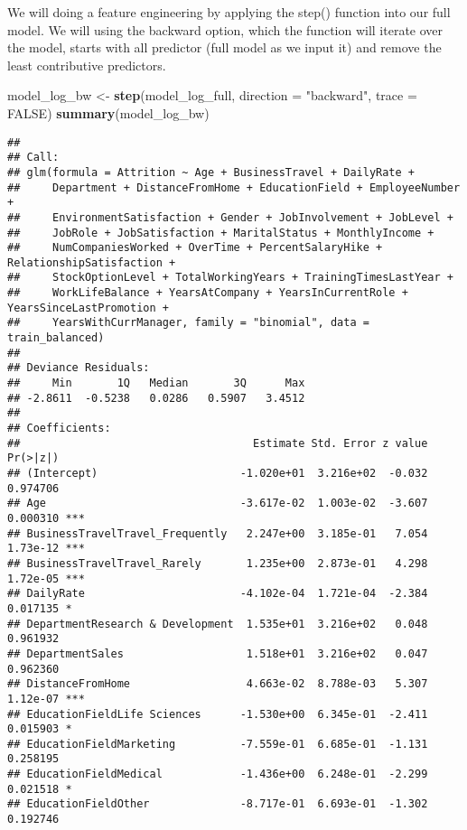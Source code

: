 \documentclass[
]{article}
\newenvironment{Shaded}{\begin{snugshade}}{\end{snugshade}}
\newcommand{\DataTypeTok}[1]{\textcolor[rgb]{0.13,0.29,0.53}{#1}}
\newcommand{\KeywordTok}[1]{\textcolor[rgb]{0.13,0.29,0.53}{\textbf{#1}}}
\newcommand{\NormalTok}[1]{#1}
\newcommand{\OtherTok}[1]{\textcolor[rgb]{0.56,0.35,0.01}{#1}}
\newcommand{\StringTok}[1]{\textcolor[rgb]{0.31,0.60,0.02}{#1}}
\begin{document}
We will doing a feature engineering by applying the step() function into
our full model. We will using the backward option, which the function
will iterate over the model, starts with all predictor (full model as we
input it) and remove the least contributive predictors.

\begin{Shaded}
\begin{Highlighting}[]
\NormalTok{model_log_bw <-}\StringTok{ }\KeywordTok{step}\NormalTok{(model_log_full, }\DataTypeTok{direction =} \StringTok{"backward"}\NormalTok{, }\DataTypeTok{trace =} \OtherTok{FALSE}\NormalTok{)}
\KeywordTok{summary}\NormalTok{(model_log_bw)}
\end{Highlighting}
\end{Shaded}

\begin{verbatim}
## 
## Call:
## glm(formula = Attrition ~ Age + BusinessTravel + DailyRate + 
##     Department + DistanceFromHome + EducationField + EmployeeNumber + 
##     EnvironmentSatisfaction + Gender + JobInvolvement + JobLevel + 
##     JobRole + JobSatisfaction + MaritalStatus + MonthlyIncome + 
##     NumCompaniesWorked + OverTime + PercentSalaryHike + RelationshipSatisfaction + 
##     StockOptionLevel + TotalWorkingYears + TrainingTimesLastYear + 
##     WorkLifeBalance + YearsAtCompany + YearsInCurrentRole + YearsSinceLastPromotion + 
##     YearsWithCurrManager, family = "binomial", data = train_balanced)
## 
## Deviance Residuals: 
##     Min       1Q   Median       3Q      Max  
## -2.8611  -0.5238   0.0286   0.5907   3.4512  
## 
## Coefficients:
##                                    Estimate Std. Error z value Pr(>|z|)    
## (Intercept)                      -1.020e+01  3.216e+02  -0.032 0.974706    
## Age                              -3.617e-02  1.003e-02  -3.607 0.000310 ***
## BusinessTravelTravel_Frequently   2.247e+00  3.185e-01   7.054 1.73e-12 ***
## BusinessTravelTravel_Rarely       1.235e+00  2.873e-01   4.298 1.72e-05 ***
## DailyRate                        -4.102e-04  1.721e-04  -2.384 0.017135 *  
## DepartmentResearch & Development  1.535e+01  3.216e+02   0.048 0.961932    
## DepartmentSales                   1.518e+01  3.216e+02   0.047 0.962360    
## DistanceFromHome                  4.663e-02  8.788e-03   5.307 1.12e-07 ***
## EducationFieldLife Sciences      -1.530e+00  6.345e-01  -2.411 0.015903 *  
## EducationFieldMarketing          -7.559e-01  6.685e-01  -1.131 0.258195    
## EducationFieldMedical            -1.436e+00  6.248e-01  -2.299 0.021518 *  
## EducationFieldOther              -8.717e-01  6.693e-01  -1.302 0.192746    

\end{verbatim}
\end{document}
